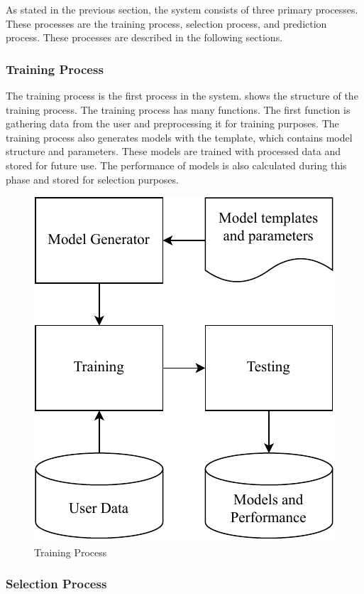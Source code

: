 \documentclass[a4paper,fleqn]{cas-dc}
\begin{document}
As stated in the previous section, the system consists of three primary processes. These processes are the training process, selection process, and prediction process. These processes are described in the following sections.

\subsubsection{Training Process}\label{subsubsec:training_process}

The training process is the first process in the system.  shows the structure of the training process. The training process has many functions. The first function is gathering data from the user and preprocessing it for training purposes. The training process also generates models with the template, which contains model structure and parameters. These models are trained with processed data and stored for future use. The performance of models is also calculated during this phase and stored for selection purposes.

\begin{figure}[ht]
    \centering
    \includegraphics[width=0.7\columnwidth]{training_and_testing.pdf}
    \caption{Training Process}
    \label{fig:training_process}
\end{figure}

\subsubsection{Selection Process}\label{subsubsec:selection_process}
\end{document}
